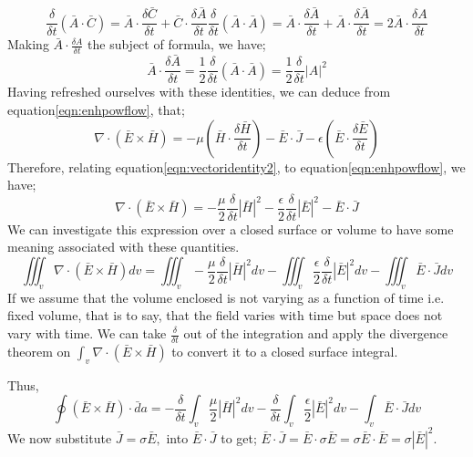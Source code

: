 \begin{dmath*}
\frac{\delta}{\delta t}(\bar{A}\cdot\bar{C})= \bar{A}\cdot\frac{\delta\bar{C}}{\delta t}+\bar{C}\cdot\frac{\delta\bar{A}}{\delta t} 
\frac{\delta}{\delta t}(\bar{A}\cdot\bar{A})
= \bar{A}\cdot\frac{\delta\bar{A}}{\delta t}+\bar{A}\cdot\frac{\delta\bar{A}}{\delta t}
= 2\bar{A}\cdot\frac{\delta A}{\delta t}
\end{dmath*}
Making $\bar{A}\cdot\frac{\delta A}{\delta t} $ the subject of formula,
we have;
\begin{dmath}
\bar{A}\cdot\frac{\delta\bar{A}}{\delta t}=\frac{1}{2}\frac{\delta}{\delta t}(\bar{A}\cdot\bar{A})=\frac{1}{2}\frac{\delta}{\delta t} |A|^{2}
\label{eqn:vectoridentity2} 
\end{dmath}
Having refreshed ourselves with these identities, we can deduce from equation\ref{eqn:enhpowflow}, that;
\begin{dmath*}
\nabla\cdot(\bar{E}\times\bar{H}) = -\mu\left(\bar{H}\cdot\frac{\delta\bar{H}}{\delta t}\right) - \bar{E}\cdot\bar{J} - \epsilon\left(\bar{E}\cdot\frac{\delta\bar{E}}{\delta t}\right)
\end{dmath*}
Therefore, relating equation\ref{eqn:vectoridentity2}, to equation\ref{eqn:enhpowflow}, we have;
\begin{dmath}
\nabla\cdot(\bar{E}\times\bar{H})=-\frac{\mu}{2}\frac{\delta}{\delta t}|\bar{H}|^{2} -  \frac{\epsilon}{2}\frac{\delta}{\delta t}|\bar{E}|^{2}-\bar{E}\cdot\bar{J} 
\end{dmath}
We can investigate this expression over a closed surface or volume to have some meaning associated with these quantities.
\begin{dmath*}
\iiint_{v}\nabla\cdot(\bar{E}\times\bar{H})dv  = \iiint_v-\frac{\mu}{2}\frac{\delta}{\delta t}|\bar{H}|^{2}dv-
\iiint_{v}\frac{\epsilon}{2}\frac{\delta}{\delta t}|\bar{E}|^{2}dv -\iiint_{v}\bar{E}\cdot\bar{J}dv 
\end{dmath*}
If we assume that the volume enclosed is not varying as a function of time i.e. fixed volume, that is to say, that the field varies with time but space does not vary with time. We can take $\frac{\delta}{\delta t}$ out of the integration and apply the divergence theorem on $ \int_{v}\nabla\cdot(\bar{E}\times\bar{H}) $ to convert it to a closed surface integral.

Thus,
\begin{dmath}
\oint(\bar{E}\times\bar{H})\cdot\bar{d}a  =  -\frac{\delta}{\delta t}  \int_{v}\frac{\mu}{2}|\bar{H}|^{2}dv -  \frac{\delta}{\delta t}\int_{v}\frac{\epsilon}{2}|\bar{E}|^{2}dv  -  \int_{v}\bar{E}\cdot\bar{J}dv 
\end{dmath}
We now substitute $ \bar{J}=\sigma\bar{E}, $ into $\bar{E}\cdot\bar{J}$ to get; 
$\bar{E}\cdot\bar{J}=\bar{E}\cdot\sigma\bar{E}=\sigma\bar{E}\cdot\bar{E}=\sigma|\bar{E}|^{2}$.

